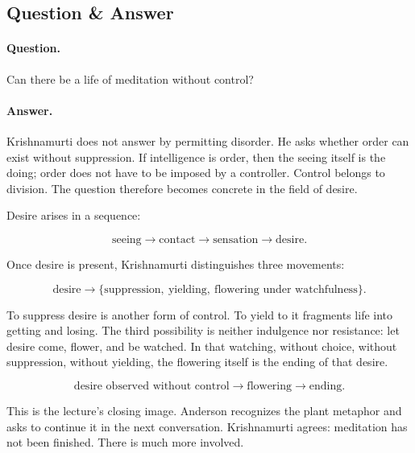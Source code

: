 \subsection{Question \& Answer}

\paragraph{Question.}
Can there be a life of meditation without control?

\paragraph{Answer.}
Krishnamurti does not answer by permitting disorder. He asks whether order can exist without suppression. If intelligence is order, then the seeing itself is the doing; order does not have to be imposed by a controller. Control belongs to division. The question therefore becomes concrete in the field of desire.

Desire arises in a sequence:

\begin{equation}
\text{seeing}
\longrightarrow
\text{contact}
\longrightarrow
\text{sensation}
\longrightarrow
\text{desire}.
\end{equation}

Once desire is present, Krishnamurti distinguishes three movements:

\begin{equation}
\text{desire}
\longrightarrow
\{\text{suppression},\ \text{yielding},\ \text{flowering under watchfulness}\}.
\end{equation}

To suppress desire is another form of control. To yield to it fragments life into getting and losing. The third possibility is neither indulgence nor resistance: let desire come, flower, and be watched. In that watching, without choice, without suppression, without yielding, the flowering itself is the ending of that desire.

\begin{equation}
\text{desire observed without control}
\longrightarrow
\text{flowering}
\longrightarrow
\text{ending}.
\end{equation}

This is the lecture's closing image. Anderson recognizes the plant metaphor and asks to continue it in the next conversation. Krishnamurti agrees: meditation has not been finished. There is much more involved.

